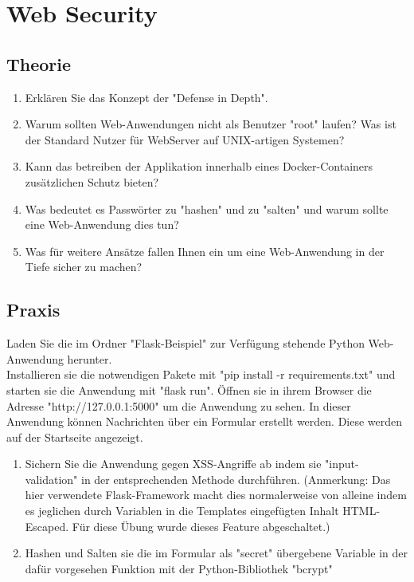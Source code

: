 \documentclass{article}
\begin{document}
\section{Web Security}

\subsection{Theorie}
\begin{enumerate}
    \item Erklären Sie das Konzept der "Defense in Depth".
    \item Warum sollten Web-Anwendungen nicht als Benutzer "root" laufen? Was ist der Standard Nutzer für WebServer auf UNIX-artigen Systemen?
    \item Kann das betreiben der Applikation innerhalb eines Docker-Containers zusätzlichen Schutz bieten?
    \item Was bedeutet es Passwörter zu "hashen" und zu "salten" und warum sollte eine Web-Anwendung dies tun?
    \item Was für weitere Ansätze fallen Ihnen ein um eine Web-Anwendung in der Tiefe sicher zu machen?
\end{enumerate}

\subsection{Praxis}
Laden Sie die im Ordner "Flask-Beispiel" zur Verfügung stehende Python Web-Anwendung herunter. \\
Installieren sie die notwendigen Pakete mit "pip install -r requirements.txt" und starten sie die Anwendung mit "flask run". Öffnen sie in ihrem Browser die Adresse "http://127.0.0.1:5000" um die Anwendung zu sehen.
In dieser Anwendung können Nachrichten über ein Formular erstellt werden. Diese werden auf der Startseite angezeigt.

\begin{enumerate}
    \item Sichern Sie die Anwendung gegen XSS-Angriffe ab indem sie "input-validation" in der entsprechenden Methode durchführen. (Anmerkung: Das hier verwendete Flask-Framework macht dies normalerweise von alleine indem es jeglichen durch Variablen in die Templates eingefügten Inhalt HTML-Escaped. Für diese Übung wurde dieses Feature abgeschaltet.)
    \item Hashen und Salten sie die im Formular als "secret" übergebene Variable in der dafür vorgesehen Funktion mit der Python-Bibliothek "bcrypt"
\end{enumerate}
\end{document}
